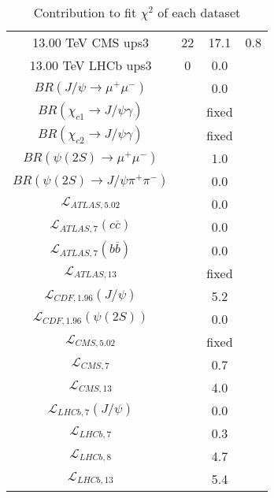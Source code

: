 \begin{table}[h!]
\begin{tabular}{c|c|c|c}
13.00 TeV CMS ups3 & 22 & 17.1 & 0.8 \\
13.00 TeV LHCb ups3 & 0 & 0.0 &  \\
\hline
$BR(J/\psi\rightarrow\mu^+\mu^-)$ &  & 0.0 &  \\
$BR(\chi_{c1}\rightarrow J/\psi\gamma)$ &  & fixed & \\
$BR(\chi_{c2}\rightarrow J/\psi\gamma)$ &  & fixed & \\
$BR(\psi(2S)\rightarrow\mu^+\mu^-)$ &  & 1.0 &  \\
$BR(\psi(2S)\rightarrow J/\psi\pi^+\pi^-)$ &  & 0.0 &  \\
$\mathcal L_{ATLAS,5.02}$ &  & 0.0 &  \\
$\mathcal L_{ATLAS,7}(c\overline c)$ &  & 0.0 &  \\
$\mathcal L_{ATLAS,7}(b\overline b)$ &  & 0.0 &  \\
$\mathcal L_{ATLAS,13}$ &  & fixed & \\
$\mathcal L_{CDF,1.96}(J/\psi)$ &  & 5.2 &  \\
$\mathcal L_{CDF,1.96}(\psi(2S))$ &  & 0.0 &  \\
$\mathcal L_{CMS,5.02}$ &  & fixed & \\
$\mathcal L_{CMS,7}$ &  & 0.7 &  \\
$\mathcal L_{CMS,13}$ &  & 4.0 &  \\
$\mathcal L_{LHCb,7}(J/\psi)$ &  & 0.0 &  \\
$\mathcal L_{LHCb,7}$ &  & 0.3 &  \\
$\mathcal L_{LHCb,8}$ &  & 4.7 &  \\
$\mathcal L_{LHCb,13}$ &  & 5.4 &  \\
\end{tabular}
\caption{Contribution to fit $\chi^2$ of each dataset}
\end{table}
